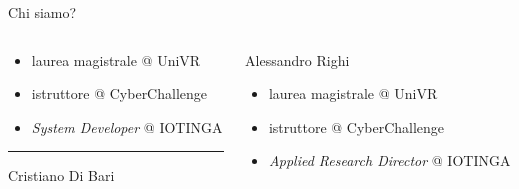 \documentclass[12pt,handout]{beamer}
\begin{document}
\begin{frame}{Chi siamo?}
\begin{columns}[T] %
\begin{column}{.48\textwidth}
\begin{itemize}
\item laurea magistrale @ UniVR
\item istruttore @ CyberChallenge
\item \textit{System Developer} @ IOTINGA
\end{itemize}        
{\color{blue}\rule{\linewidth}{2pt}}%
\begin{center}
Cristiano Di Bari
\end{center}
\end{column}%
\hfill%
\begin{column}{.48\textwidth}%
\begin{center}%

Alessandro Righi
\color{blue}{\rule{\linewidth}{2pt}}%
\begin{itemize}
\item laurea magistrale @ UniVR
\item istruttore @ CyberChallenge
\item \textit{Applied Research Director} @ IOTINGA
\end{itemize}
\end{center}
\end{column}%
\end{columns}
\end{frame}
\end{document}
